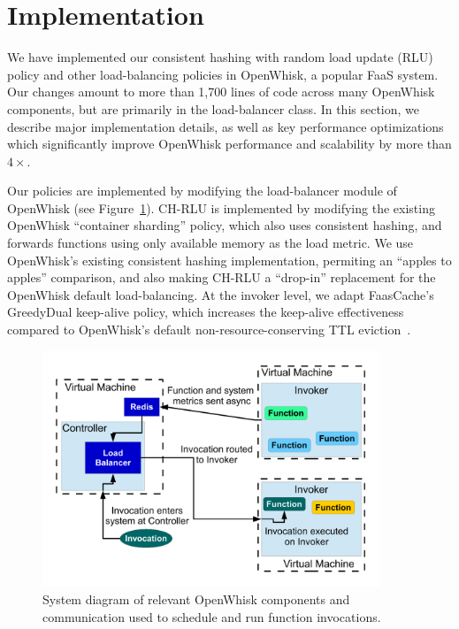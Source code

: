\section{Implementation}
\label{sec:impl}

We have implemented our consistent hashing with random load update (RLU) policy and other load-balancing policies in OpenWhisk, a popular FaaS system.
Our changes amount to more than 1,700 lines of code across many OpenWhisk components, but are primarily in the load-balancer class. 
In this section, we describe major implementation details, as well as key performance optimizations which significantly improve OpenWhisk performance and scalability by more than $4\times$. 

Our policies are implemented by modifying the load-balancer module of OpenWhisk (see Figure~\ref{fig:sys-diag}).
CH-RLU is implemented by modifying the existing OpenWhisk ``container sharding'' policy, which also uses consistent hashing, and forwards functions using only available memory as the load metric.
We use OpenWhisk's existing consistent hashing implementation, permiting an ``apples to apples'' comparison, and also making CH-RLU a ``drop-in'' replacement for the OpenWhisk default load-balancing. 
At the invoker level, we adapt FaasCache's GreedyDual keep-alive policy, which increases the keep-alive effectiveness compared to OpenWhisk's default non-resource-conserving TTL eviction~\cite{faascache-asplos21}. 

\begin{figure}  
  \centering
  \includegraphics[width=0.9\textwidth]{chrlu/faaslb-osdi22/figs/sys-diag.pdf}
  \caption{System diagram of relevant OpenWhisk components and communication used to schedule and run function invocations.}
  \label{fig:sys-diag}
\end{figure}

